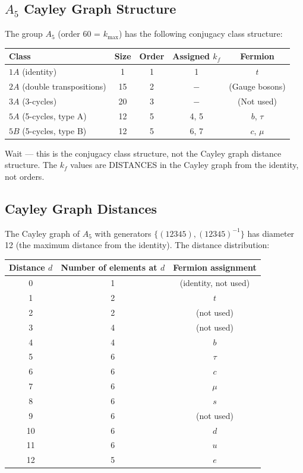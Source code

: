 \documentclass[11pt,a4paper]{article}
\begin{document}
\subsection{$A_5$ Cayley Graph Structure}

The group $A_5$ (order 60 = $k_{\max}$) has the following conjugacy class structure:

\begin{center}
\begin{tabular}{lcccc}
\toprule
\textbf{Class} & \textbf{Size} & \textbf{Order} & \textbf{Assigned $k_f$} & \textbf{Fermion} \\
\midrule
$1A$ (identity) & 1 & 1 & 1 & $t$ \\
$2A$ (double transpositions) & 15 & 2 & $-$ & (Gauge bosons) \\
$3A$ (3-cycles) & 20 & 3 & $-$ & (Not used) \\
$5A$ (5-cycles, type A) & 12 & 5 & 4, 5 & $b$, $\tau$ \\
$5B$ (5-cycles, type B) & 12 & 5 & 6, 7 & $c$, $\mu$ \\
\bottomrule
\end{tabular}
\end{center}

Wait --- this is the conjugacy class structure, not the Cayley graph distance structure. The $k_f$ values are DISTANCES in the Cayley graph from the identity, not orders.

\subsection{Cayley Graph Distances}

The Cayley graph of $A_5$ with generators $\{(12345), (12345)^{-1}\}$ has diameter 12 (the maximum distance from the identity). The distance distribution:

\begin{center}
\begin{tabular}{ccc}
\toprule
\textbf{Distance $d$} & \textbf{Number of elements at $d$} & \textbf{Fermion assignment} \\
\midrule
0 & 1 & (identity, not used) \\
1 & 2 & $t$ \\
2 & 2 & (not used) \\
3 & 4 & (not used) \\
4 & 4 & $b$ \\
5 & 6 & $\tau$ \\
6 & 6 & $c$ \\
7 & 6 & $\mu$ \\
8 & 6 & $s$ \\
9 & 6 & (not used) \\
10 & 6 & $d$ \\
11 & 6 & $u$ \\
12 & 5 & $e$ \\
\bottomrule
\end{tabular}
\end{center}
\end{document}

